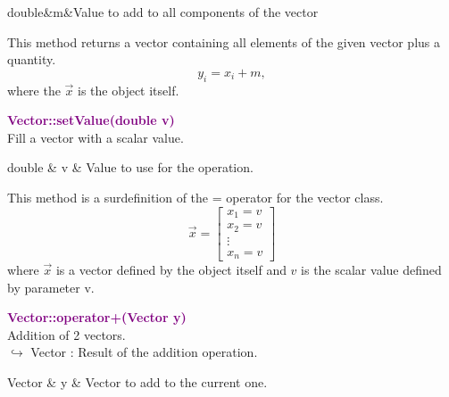\begin{tcolorbox}[width=\textwidth,myArgs,tabularx={ll|R}]
double&m&Value to add to all components of the vector
\end{tcolorbox}

This method returns a vector containing all elements of the given vector plus a quantity.
\begin{equation*}
y_i = x_i + m,
\end{equation*}
where the $\overrightarrow{x}$ is the object itself.

\textcolor{purple}{\textbf{Vector::setValue(double v)}}\label{Vector::setValue(double v)}\\
Fill a vector with a scalar value.

\begin{tcolorbox}[width=\textwidth,myArgs,tabularx={ll|R}]
double & v & Value to use for the operation.
\end{tcolorbox}

This method is a surdefinition of the = operator for the vector class.
\begin{equation*}
\overrightarrow{x}=\left[\begin{array}{c}
  x_{1}=v\\
  x_{2}=v\\
  \vdots\\
  x_{n}=v
  \end{array}\right]
\end{equation*}
where $\overrightarrow{x}$ is a vector defined by the object itself and $v$ is the scalar value defined by parameter v.

\textcolor{purple}{\textbf{Vector::operator+(Vector y)}}\label{Vector::operator+(Vector y)}\\
Addition of 2 vectors.\\ \hspace*{10mm}$\hookrightarrow$ Vector : Result of the addition operation.

\begin{tcolorbox}[width=\textwidth,myArgs,tabularx={ll|R}]
Vector & y & Vector to add to the current one.
\end{tcolorbox}

